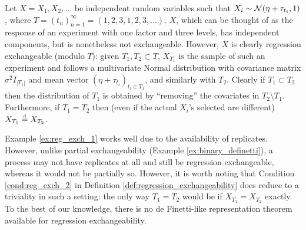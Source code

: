 \begin{mdframed}[backgroundcolor=mygray] 
	\begin{example} \label{ex:reg_exch_1}
		Let $X = X_1, X_2, ...$ be independent random variables such that $X_i \sim \mathcal{N} (\eta + \tau_{t_i}, 1)$, where $T = (t_n)_{n=1}^{\infty} = (1, 2, 3, 1, 2, 3, ...)$. $X$, which can be thought of as the response of an experiment with one factor and three levels, has independent components, but is nonetheless not exchangeable. However, $X$ is clearly regression exchangeable (modulo $T$): given $T_1, T_2 \subset T$, $X_{T_1}$ is the sample of such an experiment and follows a multivariate Normal distribution with covariance matrix $\sigma^2 I_{|T_1|}$ and mean vector $(\eta + \tau_{t_i})_{t_i \in T_1}$, and similarly with $T_2$. Clearly if $T_1 \subset T_2$ then the distribution of $T_1$ is obtained by ``removing'' the covariates in $T_2 \setminus T_1$. Furthermore, if $T_1 = T_2$ then (even if the actual $X_i$'s selected are different) $X_{T_1} \stackrel{\text{\rm\tiny d}}{=} X_{T_2}$.
	\end{example}
\end{mdframed}


Example \ref{ex:reg_exch_1} works well due to the availability of replicates. However, unlike partial exchangeability (Example \ref{ex:binary_definetti}), a process may not have replicates at all and still be regression exchangeable, whereas it would not be partially so. However, it is worth noting that Condition \ref{cond:reg_exch_2} in Definition \ref{def:regression_exchangeability} does reduce to a triviality in such a setting: the only way $T_1 = T_2$ would be if $X_{T_1} = X_{T_2}$ exactly. \\

To the best of our knowledge, there is no de Finetti-like representation theorem available for regression exchangeability.




